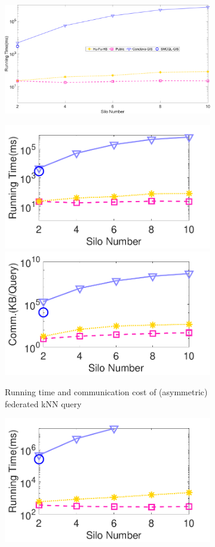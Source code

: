 \begin{figure}[t]
    \centering
    \begin{subfigure}{0.45\textwidth}
        \centering
        \includegraphics[width=\textwidth]{apdx/legend.pdf}
    \end{subfigure}
    \begin{subfigure}{0.48\textwidth}
        \centering
        \includegraphics[width=0.48\linewidth]{apdx/knn_silo_time.pdf}
        \includegraphics[width=0.48\linewidth]{apdx/knn_silo_cost.pdf}
        \caption{Running time and communication cost of (asymmetric) federated kNN query}
        \label{fig:knn-eff-silo-n-ho}
    \end{subfigure}
    \begin{subfigure}{0.48\textwidth}
        \centering
        \includegraphics[width=0.48\linewidth]{apdx/knnjoin_silo_time.pdf}

\end{subfigure}
\end{figure}
